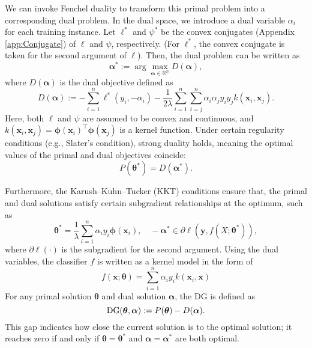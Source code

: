 We can invoke Fenchel duality to transform this primal problem into a corresponding dual problem. In the dual space, we introduce a dual variable $\alpha_i$ for each training instance.
%
Let $\ell^*$ and $\psi^*$ be the convex conjugates (Appendix \ref{app:Conjugate}) of $\ell$ and $\psi$, respectively. (For $\ell^*$, the convex conjugate is taken for the second argument of $\ell$).
%
Then, the dual problem can be written as
\begin{equation}
 \boldsymbol{\alpha}^* := \arg\max_{\boldsymbol{\alpha}\in\mathbb{R}^n} D(\boldsymbol{\alpha}),
  \label{eq:dual}
\end{equation}
where $D(\bm \alpha)$ is the dual objective defined as
\begin{equation*}
 D(\boldsymbol{\alpha}) := -\sum_{i=1}^n \ell^*(y_i, -\alpha_i) - \frac{1}{2\lambda}\sum_{i=1}^n \sum_{i=j}^n\alpha_i\alpha_j y_i y_j k (\boldsymbol{x}_i,\boldsymbol{x}_j).
\end{equation*}
%
Here, both $\ell$ and $\psi$ are assumed to be convex and continuous, and $k(\boldsymbol{x}_i,\boldsymbol{x}_j)= \bm \phi(\boldsymbol{x}_i)^\top \bm \phi(\boldsymbol{x}_j)$ is a kernel function.
%
%
%
Under certain regularity conditions (e.g., Slater's condition), strong duality holds, meaning the optimal values of the primal and dual objectives coincide:
\begin{equation*}
 P(\boldsymbol{\theta}^*)=D(\boldsymbol{\alpha^*}).
\end{equation*}

Furthermore, the Karush–Kuhn–Tucker (KKT) conditions ensure that, the primal and dual solutions satisfy certain subgradient relationships at the optimum, such as
\begin{equation}
 \boldsymbol{\theta}^* = \frac{1}{\lambda}\sum_{i=1}^n \alpha_i y_i \bm \phi(\boldsymbol{x}_i),\quad-\boldsymbol{\alpha}^* \in \partial\ell(\boldsymbol{y}, f(X ;  \boldsymbol{\theta}^*)),
 \label{eq:ktt1}
\end{equation}
where $\partial \ell(\cdot)$ is the subgradient for the second argument.
%
Using the dual variables, the classifier $f$ is written as a kernel model in the form of 
\begin{equation*}
 f(\boldsymbol{x};\boldsymbol{\theta})=\sum_{i=1}^n \alpha_i y_i k\left(\boldsymbol{x}_i, \boldsymbol{x}\right)
\end{equation*}
%
For any primal solution $\boldsymbol{\theta}$ and dual solution $\boldsymbol{\alpha}$, the DG is defined as
\begin{equation}
 {\rm DG}(\bm \theta, \bm \alpha) := P(\boldsymbol{\theta}) - D(\boldsymbol{\alpha}).
\label{eq:duality_gap}
\end{equation}
%
This gap indicates how close the current solution is to the optimal solution; it reaches zero if and only if $\boldsymbol{\theta} = \boldsymbol{\theta}^*$ and $\boldsymbol{\alpha} = \boldsymbol{\alpha}^*$ are both optimal.

